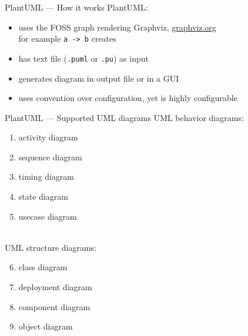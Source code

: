 \documentclass{beamer}
\begin{document}
\begin{frame}{PlantUML — How it works}
PlantUML:
\\\mbox{}
\begin{itemize}
\item uses the FOSS graph rendering \alert{Graphviz}, \href{https://graphviz.org}{graphviz.org}\\
for example \texttt{a -> b} creates\\
\begin{figure}
\centering
{}
\end{figure}
\item has text file (\texttt{.puml} or \texttt{.pu}) as input
\\\mbox{}
\item generates diagram in output file or in a GUI
\\\mbox{}
\item uses \alert{convention over configuration}, yet is \alert{highly configurable}
\end{itemize}
\end{frame}

\begin{frame}{PlantUML ­— Supported UML diagrams}
UML behavior diagrams:
\begin{enumerate}
\item activity diagram
\item sequence diagram
\item timing diagram
\item state diagram
\item usecase diagram
\end{enumerate}
\mbox{}\\
UML structure diagrams:
\begin{enumerate}\setcounter{enumi}{5}
\item class diagram
\item deployment diagram
\item component diagram
\item object diagram
\end{enumerate}
\end{frame}
\end{document}

